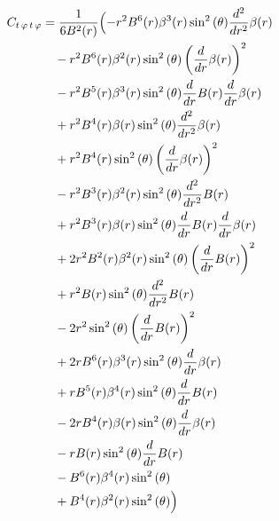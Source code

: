 \documentclass[11pt,a4paper]{article}
\begin{document}
\begin{align*}
  C_{t\,\varphi\,t\,\varphi} &= \frac{1}{6 B^{2}{\left(r \right)}}\Bigl(- r^{2} B^{6}{\left(r \right)} \beta^{3}{\left(r \right)} \sin^{2}{\left(\theta \right)} \frac{d^{2}}{d r^{2}} \beta{\left(r \right)} \\
  &\quad - r^{2} B^{6}{\left(r \right)} \beta^{2}{\left(r \right)} \sin^{2}{\left(\theta \right)} \left(\frac{d}{d r} \beta{\left(r \right)}\right)^{2} \\
  &\quad - r^{2} B^{5}{\left(r \right)} \beta^{3}{\left(r \right)} \sin^{2}{\left(\theta \right)} \frac{d}{d r} B{\left(r \right)} \frac{d}{d r} \beta{\left(r \right)} \\
  &\quad + r^{2} B^{4}{\left(r \right)} \beta{\left(r \right)} \sin^{2}{\left(\theta \right)} \frac{d^{2}}{d r^{2}} \beta{\left(r \right)} \\
  &\quad + r^{2} B^{4}{\left(r \right)} \sin^{2}{\left(\theta \right)} \left(\frac{d}{d r} \beta{\left(r \right)}\right)^{2} \\
  &\quad - r^{2} B^{3}{\left(r \right)} \beta^{2}{\left(r \right)} \sin^{2}{\left(\theta \right)} \frac{d^{2}}{d r^{2}} B{\left(r \right)} \\
  &\quad + r^{2} B^{3}{\left(r \right)} \beta{\left(r \right)} \sin^{2}{\left(\theta \right)} \frac{d}{d r} B{\left(r \right)} \frac{d}{d r} \beta{\left(r \right)} \\
  &\quad + 2 r^{2} B^{2}{\left(r \right)} \beta^{2}{\left(r \right)} \sin^{2}{\left(\theta \right)} \left(\frac{d}{d r} B{\left(r \right)}\right)^{2} \\
  &\quad + r^{2} B{\left(r \right)} \sin^{2}{\left(\theta \right)} \frac{d^{2}}{d r^{2}} B{\left(r \right)} \\
  &\quad - 2 r^{2} \sin^{2}{\left(\theta \right)} \left(\frac{d}{d r} B{\left(r \right)}\right)^{2} \\
  &\quad + 2 r B^{6}{\left(r \right)} \beta^{3}{\left(r \right)} \sin^{2}{\left(\theta \right)} \frac{d}{d r} \beta{\left(r \right)} \\
  &\quad + r B^{5}{\left(r \right)} \beta^{4}{\left(r \right)} \sin^{2}{\left(\theta \right)} \frac{d}{d r} B{\left(r \right)} \\
  &\quad - 2 r B^{4}{\left(r \right)} \beta{\left(r \right)} \sin^{2}{\left(\theta \right)} \frac{d}{d r} \beta{\left(r \right)} \\
  &\quad - r B{\left(r \right)} \sin^{2}{\left(\theta \right)} \frac{d}{d r} B{\left(r \right)} \\
  &\quad - B^{6}{\left(r \right)} \beta^{4}{\left(r \right)} \sin^{2}{\left(\theta \right)} \\
  &\quad + B^{4}{\left(r \right)} \beta^{2}{\left(r \right)} \sin^{2}{\left(\theta \right)}\Bigr)
\end{align*}
\end{document}
